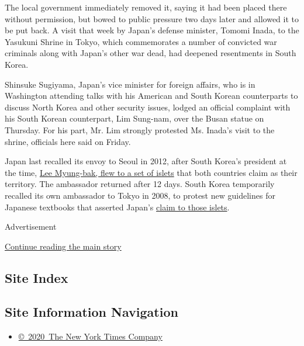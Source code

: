 The local government immediately removed it, saying it had been placed
there without permission, but bowed to public pressure two days later
and allowed it to be put back. A visit that week by Japan's defense
minister, Tomomi Inada, to the Yasukuni Shrine in Tokyo, which
commemorates a number of convicted war criminals along with Japan's
other war dead, had deepened resentments in South Korea.

Shinsuke Sugiyama, Japan's vice minister for foreign affairs, who is in
Washington attending talks with his American and South Korean
counterparts to discuss North Korea and other security issues, lodged an
official complaint with his South Korean counterpart, Lim Sung-nam, over
the Busan statue on Thursday. For his part, Mr. Lim strongly protested
Ms. Inada's visit to the shrine, officials here said on Friday.

Japan last recalled its envoy to Seoul in 2012, after South Korea's
president at the time,
\href{http://www.nytimes.com/2012/08/11/world/asia/south-koreans-visit-to-disputed-islets-angers-japan.html}{Lee
Myung-bak, flew to a set of islets} that both countries claim as their
territory. The ambassador returned after 12 days. South Korea
temporarily recalled its own ambassador to Tokyo in 2008, to protest new
guidelines for Japanese textbooks that asserted Japan's
\href{http://www.nytimes.com/2008/08/31/world/asia/31islands.html}{claim
to those islets}.

Advertisement

\protect\hyperlink{after-bottom}{Continue reading the main story}

\hypertarget{site-index}{%
\subsection{Site Index}\label{site-index}}

\hypertarget{site-information-navigation}{%
\subsection{Site Information
Navigation}\label{site-information-navigation}}

\begin{itemize}
\tightlist
\item
  \href{https://help.nytimes.com/hc/en-us/articles/115014792127-Copyright-notice}{©~2020~The
  New York Times Company}
\end{itemize}

